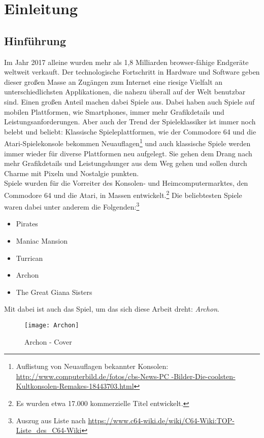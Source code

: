 \chapter{Einleitung}
\label{cha:Einleitung}

\section{Hinführung}
\label{sec:hinfuhrung}
Im Jahr 2017 alleine wurden mehr als 1,8 Milliarden browser-fähige Endgeräte weltweit verkauft.\cite{statista_absatz} Der technologische Fortschritt in Hardware und Software geben dieser großen Masse an Zugängen zum Internet eine riesige Vielfalt an unterschiedlichsten Applikationen, die nahezu überall auf der Welt benutzbar sind. Einen großen Anteil machen dabei Spiele aus. Dabei haben auch Spiele auf mobilen Plattformen, wie Smartphones, immer mehr Grafikdetails und Leistungsanforderungen. Aber auch der Trend der Spieleklassiker ist immer noch belebt und beliebt: Klassische Spieleplattformen, wie der Commodore 64 und die Atari-Spielekonsole bekommen Neuauflagen\footnote{Auflistung von Neuauflagen bekannter Konsolen:\\ \url{http://www.computerbild.de/fotos/cbs-News-PC
-Bilder-Die-coolsten-Kultkonsolen-Remakes-18443703.html}} und auch klassische Spiele werden immer wieder für diverse Plattformen neu aufgelegt. Sie gehen dem Drang nach mehr Grafikdetails und Leistungshunger aus dem Weg gehen und sollen durch Charme mit Pixeln und Nostalgie punkten.\\
Spiele wurden für die Vorreiter des Konsolen- und Heimcomputermarktes, den Commodore 64 und die Atari, in Massen entwickelt.\footnote{Es wurden etwa 17.000 kommerzielle Titel entwickelt.\cite{commodore64}}
Die beliebtesten Spiele waren dabei unter anderem die Folgenden:\footnote{Auszug aus Liste nach \url{https://www.c64-wiki.de/wiki/C64-Wiki:TOP-Liste_des_C64-Wiki}}
\begin{itemize}
	\item Pirates
	\item Maniac Mansion
	\item Turrican 
	\item Archon
	\item The Great Giana Sisters
\end{itemize}
Mit dabei ist auch das Spiel, um das sich diese Arbeit dreht: \emph{Archon}.
\begin{figure}[htp]
\centering
\captionsetup{justification=centering}
\texttt{[image: Archon]}
\caption[Archon - Cover]{Archon - Cover\footnotemark}
\label{fig:Archon_Cover}
\end{figure}
